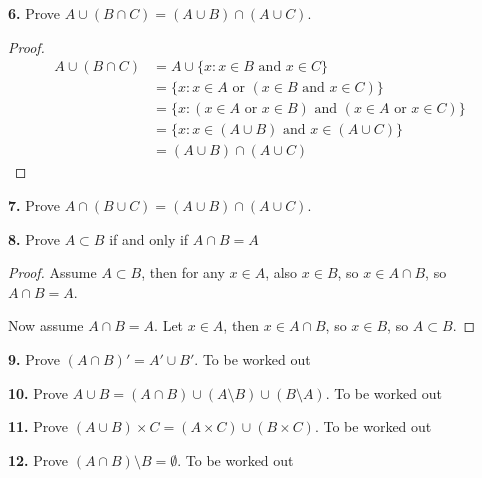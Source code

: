 \documentclass[12pt]{amsart}
\newenvironment{statement}[1]{\smallskip\noindent\color[rgb]{1.00,0.00,0.50} {\bf #1.}}{}
\theoremstyle{definition}
\theoremstyle{remark}
\begin{document}
\begin{statement}{6}
Prove $A \cup (B \cap C) = (A \cup B) \cap (A \cup C)$.
\end{statement}

\begin{proof}
\begin{align*}
  A \cup (B \cap C) &= A \cup \{x : x \in B \text{ and } x \in C \} \\
  &= \{ x : x \in A \text{ or } (x \in B \text{ and } x \in C) \} \\
  & = \{x : (x \in A \text{ or } x \in B) \text{ and } (x \in A \text{ or } x \in C) \} \\
  & = \{x : x \in (A \cup B) \text{ and } x \in (A \cup C) \} \\
  & = (A \cup B) \cap (A \cup C)
\end{align*}
\end{proof}


\begin{statement}{7}
Prove $A \cap (B \cup C) = (A \cup B) \cap (A \cup C)$.
\end{statement}




\begin{statement}{8}
Prove $A \subset B$ if and only if $A \cap B = A$
\end{statement}
\begin{proof}
  Assume $A \subset B$, then for any $x \in A$, also $x \in B$, so $x
  \in A \cap B$, so $A \cap B = A$.

  Now assume $A \cap B = A$. Let $x \in A$, then $x \in A \cap B$, so
  $x \in B$, so $A \subset B$.
\end{proof}


\begin{statement}{9}
Prove $(A \cap B)' = A' \cup B'$.
\end{statement}
To be worked out


\begin{statement}{10}
Prove $A \cup B = (A \cap B) \cup (A \setminus B) \cup (B \setminus A)$.
\end{statement}
To be worked out


\begin{statement}{11}
Prove $(A \cup B) \times C = (A \times C) \cup (B \times C)$.
\end{statement}
To be worked out


\begin{statement}{12}
Prove $(A \cap B) \setminus B = \emptyset$.
\end{statement}
To be worked out
\end{document}
